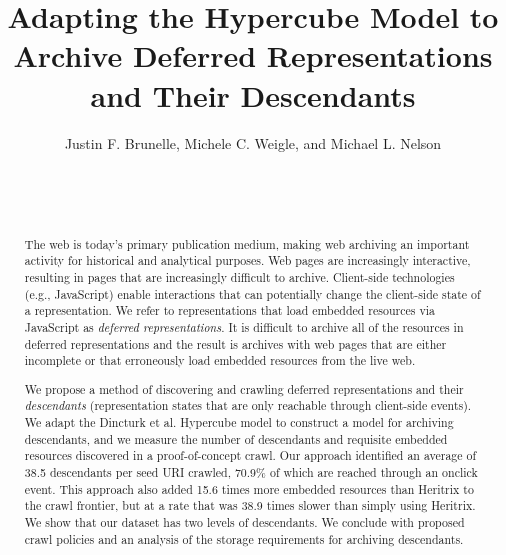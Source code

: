\documentclass{sig-alternate}
\begin{document}
\title{Adapting the Hypercube Model to Archive Deferred Representations and Their Descendants}





\author{
\alignauthor
Justin F. Brunelle, Michele C. Weigle, and Michael L. Nelson\\
       \\
       \\
       \\
}




\maketitle
\begin{abstract}
The web is today's primary publication medium, making web archiving an important activity for historical and analytical purposes. Web pages are increasingly interactive, resulting in pages that are increasingly difficult to archive. Client-side technologies (e.g., JavaScript) enable interactions that can potentially change the client-side state of a representation. %
We refer to representations that load embedded resources via JavaScript as \emph{deferred representations}. It is difficult to archive all of the resources in deferred representations and the result is archives with web pages that are either incomplete or that erroneously load embedded resources from the live web.


We propose a method of discovering and crawling deferred representations and their \emph{descendants} (representation states that are only reachable through client-side events). We adapt the Dincturk et al. Hypercube model to construct a model for archiving descendants, and we measure the number of descendants and requisite embedded resources discovered in a proof-of-concept crawl. Our approach identified an average of 38.5 descendants per seed URI crawled, 70.9\% of which are reached through an onclick event. This approach also added 15.6 times more embedded resources than Heritrix to the crawl frontier, but at a rate that was 38.9 times slower than simply using Heritrix. We show that our dataset has two levels of descendants. We conclude with proposed crawl policies and an analysis of the storage requirements for archiving descendants.

\end{abstract}
\end{document}
